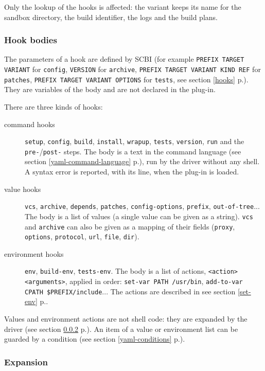 \documentclass[a4paper,12pt,twoside]{article}
\newcommand{\code}[1]{\texttt{#1}}
\newcommand{\seeref}[1]{see section \ref{#1} p.\pageref{#1}}
\begin{document}
Only the lookup of the hooks is affected: the variant keeps its name for
the sandbox directory, the build identifier, the logs and the build
plans.

\subsubsection{Hook bodies}
\label{yaml-hook-bodies}

The parameters of a hook are defined by SCBI (for example
\code{PREFIX TARGET VARIANT} for \code{config}, \code{VERSION} for
\code{archive}, \code{PREFIX TARGET VARIANT KIND REF} for \code{patches},
\code{PREFIX TARGET VARIANT OPTIONS} for \code{tests}, \seeref{hooks}). They
are variables of the body and are not declared in the plug-in.

There are three kinds of hooks:

\begin{description}
	\item[command hooks] \code{setup}, \code{config}, \code{build},
	\code{install}, \code{wrapup}, \code{tests}, \code{version}, \code{run}
	and the \code{pre-}/\code{post-} steps. The body is a text in the
	command language (\seeref{yaml-command-language}), run by the driver
	without any shell. A syntax error is reported, with its line, when the
	plug-in is loaded.
	\item[value hooks] \code{vcs}, \code{archive}, \code{depends},
	\code{patches}, \code{config-options}, \code{prefix},
	\code{out-of-tree}... The body is a list of values (a single value can be
	given as a string). \code{vcs} and \code{archive} can also be given as a
	mapping of their fields (\code{proxy}, \code{options}, \code{protocol},
	\code{url}, \code{file}, \code{dir}).
	\item[environment hooks] \code{env}, \code{build-env},
	\code{tests-env}. The body is a list of actions, \code{<action>
	<arguments>}, applied in order: \code{set-var PATH /usr/bin},
	\code{add-to-var CPATH \$PREFIX/include}... The actions are described in
	\seeref{set-env}.
\end{description}

Values and environment actions are not shell code: they are expanded by the
driver (\seeref{yaml-expansion}). An item of a value or environment list can
be guarded by a condition (\seeref{yaml-conditions}).

\subsubsection{Expansion}
\label{yaml-expansion}
\end{document}
